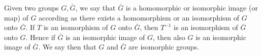 Given two groups $G, \bar{G}$, we say that $\bar{G}$ is a homomorphic or isomorphic image (or map) of $G$ according as there exists a homomorphism or an isomorphism of $G$ onto $\bar{G}$. If $T$ is an isomorphism of $G$ onto $\bar{G}$, then $T^{-1}$ is an isomorphism of $\bar{G}$ onto $G$. Hence if $\bar{G}$ is an isomorphic image of $G$, then also $G$ is an isomorphic image of $\bar{G}$. We say then that $G$ and $\bar{G}$ are isomorphic groups.
